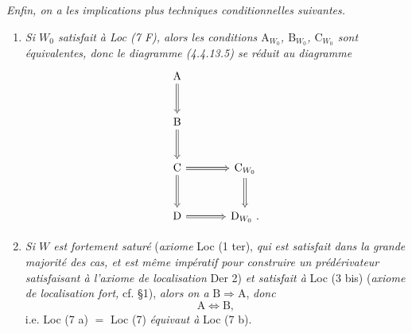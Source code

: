 \noindent{}\enspace\textit{Enfin, on a les implications plus techniques conditionnelles suivantes.}
\begin{enumerate}[leftmargin=2.5em]
\item[a)] \textit{Si $W_0$ satisfait à Loc (7 F), alors les conditions $\mathrm{A}_{W_0}$, $\mathrm{B}_{W_0}$, $\mathrm{C}_{W_0}$ sont équivalentes, donc le diagramme (4.4.13.5) se réduit au diagramme}
\[
\begin{tikzcd}[row sep=large, column sep=large]
\mathrm{A} \arrow[d,Rightarrow] & \\
\mathrm{B} \arrow[d,Rightarrow] & \\
\mathrm{C} \arrow[r,Rightarrow] \arrow[d,Rightarrow] & \mathrm{C}_{W_0} \arrow[d,Rightarrow] \\
\mathrm{D} \arrow[r,Rightarrow] & \mathrm{D}_{W_0}\ .
\end{tikzcd}
\]

\item[b)] \textit{Si $W$ est fortement saturé} (\textit{axiome} Loc (1 ter), \textit{qui}
%
\textit{est satisfait dans la grande majorité des cas, et est même impératif pour construire un prédérivateur satisfaisant à l'axiome de localisation} Der 2) \textit{et satisfait à} Loc (3 bis) (\textit{axiome de localisation fort,} cf. §1), \textit{alors on a} $\mathrm{B}\Longrightarrow\mathrm{A}$, \textit{donc}
\[
\mathrm{A} \iff \mathrm{B},
\]
i.e. Loc (7 a) $=$ Loc (7) \textit{équivaut à} Loc (7 b).
\end{enumerate}

